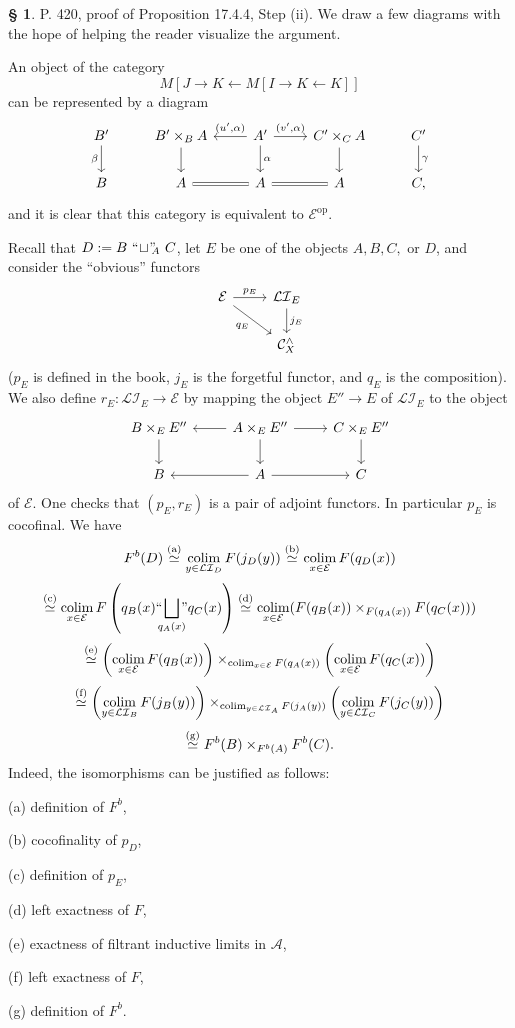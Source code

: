\documentclass[12pt]{article}%
\theoremstyle{remark}
\theoremstyle{definition}
\newtheorem{s}[thm]{\S}%
\newcommand{\nn}{\noindent}
\newcommand{\cc}{\mathcal}
\newcommand{\A}{\mathcal A}
\newcommand{\C}{\mathcal C}
\DeclareMathOperator*{\col}{colim}
\DeclareMathOperator{\op}{op}
\begin{document}
\begin{s}
P. 420, proof of Proposition 17.4.4, Step (ii). We draw a few diagrams with the hope of helping the reader visualize the argument. 

An object of the category 
$$
M[J\to K\leftarrow M[I\to K\leftarrow K]]
$$ 
can be represented by a diagram 
$$
\begin{tikzcd}
B'\ar{d}[swap]{\beta}&B'\times_BA\ar{d}&A'\ar{l}[swap]{(u',\alpha)}\ar{r}{(v',\alpha)}\ar{d}{\alpha}&C'\times_CA\ar{d}&C'\ar{d}{\gamma}\\ 
B&A\ar[equal]{r}&A\ar[equal]{r}&A&C, 
\end{tikzcd}
$$ 
and it is clear that this category is equivalent to $\cc E^{\op}$. 

Recall that $D:=B\ ``\!\sqcup\!"\!\!_A\ C$, let $E$ be one of the objects $A,B,C,$ or $D$, and consider the ``obvious'' functors 
$$
\begin{tikzcd}
\cc E\ar{r}{p_E}\ar{rd}[swap]{q_E}&\cc{LI}_E\ar{d}{j_E}\\ 
{}&\C_X^\wedge
\end{tikzcd}
$$ 
($p_E$ is defined in the book, $j_E$ is the forgetful functor, and $q_E$ is the composition). We also define $r_E:\cc{LI}_E\to\cc E$ by mapping the object $E''\to E$ of $\cc{LI}_E$ to the object 
$$
\begin{tikzcd}
B\times_EE''\ar{d}&A\times_EE''\ar{l}\ar{r}\ar{d}&C\times_EE''\ar{d}\\ 
B&A\ar{r}\ar{l}&C
\end{tikzcd}
$$ 
of $\cc E$. One checks that $(p_E,r_E)$ is a pair of adjoint functors. In particular $p_E$ is cocofinal. We have
$$
F^b(D)
\overset{(\text a)}{\simeq}\col_{y\in\cc{LI}_D}F(j_D(y))
\overset{(\text b)}{\simeq}\col_{x\in\cc E}F(q_D(x))
$$
$$
\overset{(\text c)}{\simeq}\col_{x\in\cc E}F\left(q_B(x)``\!\!\!\bigsqcup_{q_A(x)}\!\!\!"q_C(x)\right)
\overset{(\text d)}{\simeq}\col_{x\in\cc E}(F(q_B(x))\times_{F(q_A(x))}F(q_C(x)))
$$
$$
\overset{(\text e)}{\simeq}\left(\col_{x\in\cc E}F(q_B(x))\right)\times_{\col_{x\in\cc E}F(q_A(x))}\left(\col_{x\in\cc E}F(q_C(x))\right)
$$ 
$$
\overset{(\text f)}{\simeq}\left(\col_{y\in\cc{LI}_B}F(j_B(y))\right)\times_{\col_{y\in\cc{LI}_A}F(j_A(y))}\left(\col_{y\in\cc{LI}_C}F(j_C(y))\right)
$$ 
$$
\overset{(\text g)}{\simeq}F^b(B)\times_{F^b(A)}F^b(C).
$$ 
Indeed, the isomorphisms can be justified as follows: 

\nn(a) definition of $F^b$, 

\nn(b) cocofinality of $p_D$,

\nn(c) definition of $p_E$, 

\nn(d) left exactness of $F$, 

\nn(e) exactness of filtrant inductive limits in $\A$, 

\nn(f) left exactness of $F$, 

\nn(g) definition of $F^b$.
\end{s}
\end{document}
